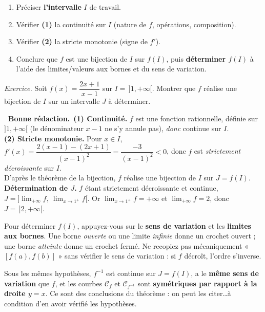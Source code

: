 \documentclass[11pt,a4paper]{article}
\newcommand{\ok}{\textcolor{METeal}{\textbf{\ding{51}\ \sffamily Bonne rédaction.}}\ }
\begin{document}
\begin{methode}
\begin{enumerate}
  \item Préciser \textbf{l'intervalle} $I$ de travail.
  \item Vérifier \textbf{(1)} la continuité sur $I$ (nature de $f$, opérations, composition).
  \item Vérifier \textbf{(2)} la stricte monotonie (signe de $f'$).
  \item Conclure que $f$ est une bijection de $I$ sur $f(I)$, puis \textbf{déterminer $f(I)$}
  à l'aide des limites/valeurs aux bornes et du sens de variation.
\end{enumerate}
\end{methode}

\emph{Exercice.} Soit $f(x)=\dfrac{2x+1}{x-1}$ sur $I=\,]1,+\infty[$. Montrer que $f$ réalise
une bijection de $I$ sur un intervalle $J$ à déterminer.
\begin{bonne}
\ok \textbf{(1) Continuité.} $f$ est une fonction rationnelle, définie sur $]1,+\infty[$ (le
dénominateur $x-1$ ne s'y annule pas), \emph{donc} continue sur $I$.\\
\textbf{(2) Stricte monotonie.} Pour $x\in I$,
$f'(x)=\dfrac{2(x-1)-(2x+1)}{(x-1)^2}=\dfrac{-3}{(x-1)^2}<0$, donc $f$ est \emph{strictement
décroissante} sur $I$.\\
D'après le théorème de la bijection, $f$ réalise une bijection de $I$ sur $J=f(I)$.\\
\textbf{Détermination de $J$.} $f$ étant strictement décroissante et continue,
$J=\big]\lim_{+\infty}f,\ \lim_{x\to 1^+}f\big[$. Or $\lim_{x\to1^+}f=+\infty$ et
$\lim_{+\infty}f=2$, donc $J=\,]2,+\infty[$.
\end{bonne}

\begin{astuce}
Pour déterminer $f(I)$, appuyez-vous sur le \textbf{sens de variation} et les
\textbf{limites aux bornes}. Une borne \emph{ouverte} ou une limite \emph{infinie} donne un
crochet ouvert ; une borne \emph{atteinte} donne un crochet fermé. Ne recopiez pas
mécaniquement « $[f(a),f(b)]$ » sans vérifier le sens de variation : si $f$ décroît, l'ordre
s'inverse.
\end{astuce}

\begin{remarque}
Sous les mêmes hypothèses, $f^{-1}$ est continue sur $J=f(I)$, a le \textbf{même sens de
variation} que $f$, et les courbes $\mathcal C_f$ et $\mathcal C_{f^{-1}}$ sont
\textbf{symétriques par rapport à la droite $y=x$}. Ce sont des conclusions du théorème : on
peut les citer\dots à condition d'en avoir vérifié les hypothèses.
\end{remarque}
\end{document}
